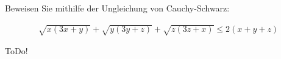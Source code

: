 
\begin{exercise}

Beweisen Sie mithilfe der Ungleichung von Cauchy-Schwarz:

\begin{align*}
    \sqrt{x (3x + y)} + \sqrt{y (3y + z)} + \sqrt{z (3z + x)}
    \leq
    2 (x + y + z)
\end{align*}

\end{exercise}


\begin{solution}

ToDo!

\end{solution}

